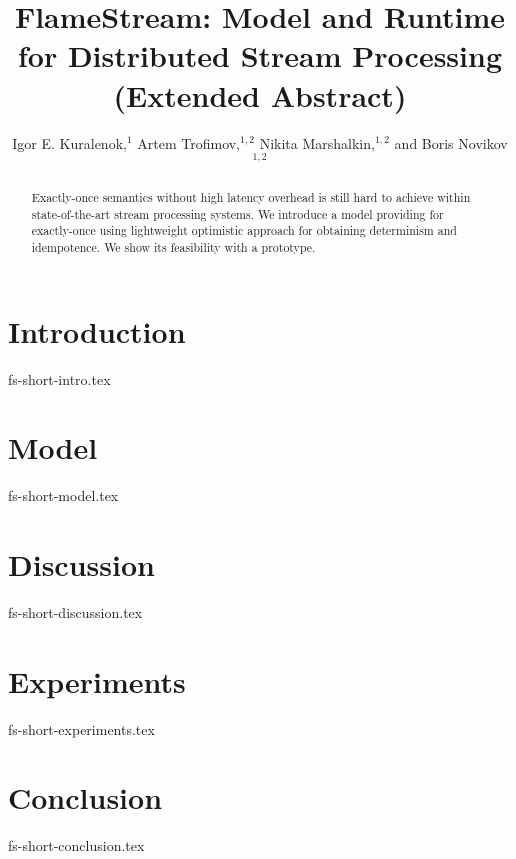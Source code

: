 \documentclass[sigconf]{acmart}
\theoremstyle{remark}
\newcommand {\FlameStream} {FlameStream}
\begin{document}

\title {\FlameStream: Model and Runtime for Distributed Stream Processing (Extended Abstract)}

\author{  Igor E. Kuralenok,$^1$     Artem Trofimov,$^ {1,2}$    Nikita Marshalkin,$^ {1,2}$   and  Boris Novikov$^ {1,2}$ }

\begin{abstract}
Exactly-once semantics without high latency overhead is still hard to achieve within state-of-the-art stream processing systems. We introduce a model providing for exactly-once using lightweight optimistic approach for obtaining determinism and idempotence. We show its feasibility with a prototype.
\end {abstract}


\maketitle

\section {Introduction}
 {fs-short-intro.tex}

\section {Model}
 {fs-short-model.tex}

\section {Discussion}
 {fs-short-discussion.tex}

\section {Experiments}
 {fs-short-experiments.tex}

\section {Conclusion}
 {fs-short-conclusion.tex}



\end{document}

